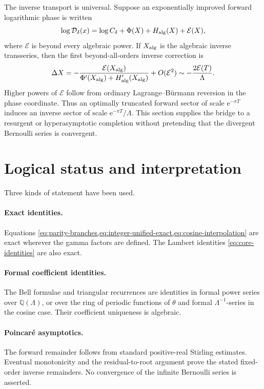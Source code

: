 \documentclass[11pt,oneside]{article}
\theoremstyle{plain}
\theoremstyle{definition}
\theoremstyle{remark}
\newcommand{\e}{\mathrm e}
\newcommand{\Q}{\mathbb Q}
\newcommand{\DF}{\mathcal D}
\begin{document}
The inverse transport is universal.  Suppose an exponentially improved
forward logarithmic phase is written
\begin{equation}
 \log\DF_\delta(x)
 =\log C_\delta+\Phi(X)+H_{\rm alg}(X)+\mathcal E(X),
 \label{eq:forward-exp-sector}
\end{equation}
where \(\mathcal E\) is beyond every algebraic power.  If
\(X_{\rm alg}\) is the algebraic inverse transseries, then the first
beyond-all-orders inverse correction is
\begin{equation}
 \Delta X
 =-\frac{\mathcal E(X_{\rm alg})}
 {\Phi'(X_{\rm alg})+H_{\rm alg}'(X_{\rm alg})}
 +O(\mathcal E^2)
 \sim-\frac{2\mathcal E(T)}{\Lambda}.
 \label{eq:inverse-exp-transport}
\end{equation}
Higher powers of \(\mathcal E\) follow from ordinary Lagrange--B\"urmann
reversion in the phase coordinate.  Thus an optimally truncated forward sector
of scale \(\e^{-\pi T}\) induces an inverse sector of scale
\(\e^{-\pi T}/\Lambda\).  This section supplies the bridge to a resurgent or
hyperasymptotic completion without pretending that the divergent Bernoulli
series is convergent.

\section{Logical status and interpretation}
\label{sec:status}

Three kinds of statement have been used.

\paragraph{Exact identities.}
Equations \cref{eq:parity-branches,eq:integer-unified-exact,eq:cosine-interpolation} are exact wherever the gamma factors are defined.
The Lambert identities \cref{eq:core-identities} are also exact.

\paragraph{Formal coefficient identities.}
The Bell formulae and triangular recurrences are identities in formal power
series over \(\Q(\Lambda)\), or over the ring of periodic functions of
\(\theta\) and formal \(\Lambda^{-1}\)-series in the cosine case.  Their
coefficient uniqueness is algebraic.

\paragraph{Poincar\'e asymptotics.}
The forward remainder follows from standard positive-real Stirling estimates.
Eventual monotonicity and the residual-to-root argument prove the stated
fixed-order inverse remainders.  No convergence of the infinite Bernoulli
series is asserted.
\end{document}
